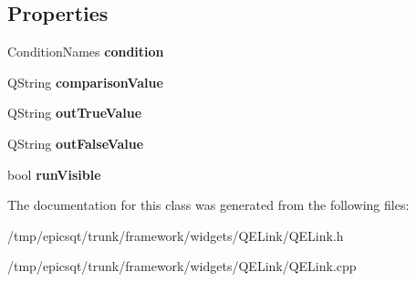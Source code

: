 \subsection*{Properties}
\begin{DoxyCompactItemize}
\item 
\hypertarget{classQELink_a9d8a7d0a2e3e8e1990e39744421a769b}{
ConditionNames {\bfseries condition}}
\label{classQELink_a9d8a7d0a2e3e8e1990e39744421a769b}

\item 
\hypertarget{classQELink_a75adbd0ae5580f403a85ae26f4d4c7f7}{
QString {\bfseries comparisonValue}}
\label{classQELink_a75adbd0ae5580f403a85ae26f4d4c7f7}

\item 
\hypertarget{classQELink_a91959ab634890a3cbeba69f3ae5109a7}{
QString {\bfseries outTrueValue}}
\label{classQELink_a91959ab634890a3cbeba69f3ae5109a7}

\item 
\hypertarget{classQELink_a88c1b378fe7d57781432653b4cbb0055}{
QString {\bfseries outFalseValue}}
\label{classQELink_a88c1b378fe7d57781432653b4cbb0055}

\item 
\hypertarget{classQELink_a1a5c3bd9c25bc7bade374f574d2db3e0}{
bool {\bfseries runVisible}}
\label{classQELink_a1a5c3bd9c25bc7bade374f574d2db3e0}

\end{DoxyCompactItemize}


The documentation for this class was generated from the following files:\begin{DoxyCompactItemize}
\item 
/tmp/epicsqt/trunk/framework/widgets/QELink/QELink.h\item 
/tmp/epicsqt/trunk/framework/widgets/QELink/QELink.cpp\end{DoxyCompactItemize}
